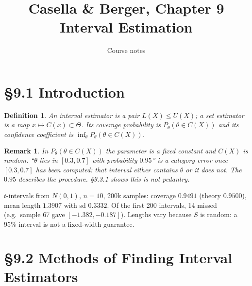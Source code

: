 \documentclass[11pt]{article}
\title{Casella \& Berger, Chapter 9\\[2pt]\large Interval Estimation}
\author{Course notes}\date{}
\newtheorem{definition}[theorem]{Definition}
\newtheorem{remark}[theorem]{Remark}
\begin{document}
\maketitle

\section{\S9.1 Introduction}
\begin{definition}
An interval estimator is a pair $L(X)\le U(X)$; a set estimator is a map $x\mapsto C(x)\subset\Theta$. Its coverage probability is $P_\theta(\theta\in C(X))$ and its confidence coefficient is $\inf_\theta P_\theta(\theta\in C(X))$.
\end{definition}
\begin{remark}
In $P_\theta(\theta\in C(X))$ the parameter is a fixed constant and $C(X)$ is random. ``$\theta$ lies in $[0.3,0.7]$ with probability $0.95$'' is a category error once $[0.3,0.7]$ has been computed: that interval either contains $\theta$ or it does not. The $0.95$ describes the procedure. \S9.3.1 shows this is not pedantry.
\end{remark}
\begin{simbox}
$t$-intervals from $N(0,1)$, $n=10$, 200k samples: coverage $0.9491$ (theory $0.9500$), mean length $1.3907$ with sd $0.3332$. Of the first 200 intervals, 14 missed (e.g.\ sample 67 gave $[-1.382,-0.187]$). Lengths vary because $S$ is random: a 95\% interval is not a fixed-width guarantee.
\end{simbox}

\section{\S9.2 Methods of Finding Interval Estimators}
\end{document}
